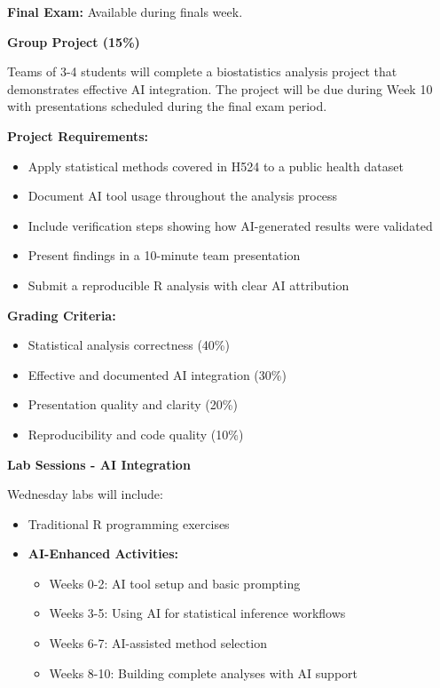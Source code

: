 \documentclass[11pt]{article}
\begin{document}
\textbf{Final Exam:} Available during finals week.

\vspace{8pt}

\noindent\textbf{Group Project (15\%)}

Teams of 3-4 students will complete a biostatistics analysis project that demonstrates effective AI integration. The project will be due during Week 10 with presentations scheduled during the final exam period.

\textbf{Project Requirements:}
\begin{itemize}[leftmargin=20pt]
\item Apply statistical methods covered in H524 to a public health dataset
\item Document AI tool usage throughout the analysis process
\item Include verification steps showing how AI-generated results were validated
\item Present findings in a 10-minute team presentation
\item Submit a reproducible R analysis with clear AI attribution
\end{itemize}

\textbf{Grading Criteria:}
\begin{itemize}[leftmargin=20pt]
\item Statistical analysis correctness (40\%)
\item Effective and documented AI integration (30\%)
\item Presentation quality and clarity (20\%)
\item Reproducibility and code quality (10\%)
\end{itemize}

\vspace{8pt}

\noindent\textbf{Lab Sessions - AI Integration}

Wednesday labs will include:
\begin{itemize}[leftmargin=20pt]
\item Traditional R programming exercises
\item \textcolor{aiblue}{\textbf{AI-Enhanced Activities:}}
\begin{itemize}
\item Weeks 0-2: AI tool setup and basic prompting
\item Weeks 3-5: Using AI for statistical inference workflows
\item Weeks 6-7: AI-assisted method selection
\item Weeks 8-10: Building complete analyses with AI support
\end{itemize}
\end{itemize}
\end{document}
